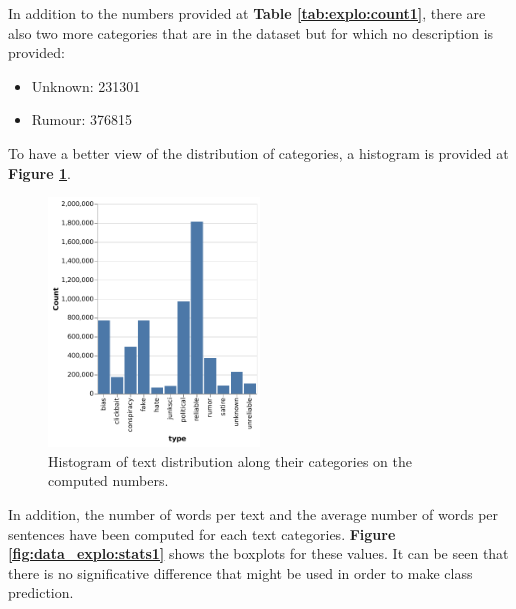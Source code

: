 In addition to the numbers provided at \textbf{Table \ref{tab:explo:count1}}, there are also two more categories that are in the dataset but for which no description is provided: 
\begin{itemize}
  \item Unknown: 231301
  \item Rumour: 376815
\end{itemize}
 To have a better view of the distribution of categories, a histogram is provided at \textbf{Figure \ref{fig:chap1:hist1}}.\\
\begin{figure}[!ht]
 \centering
 \includegraphics[width=0.5\textwidth]{images/data_exploration/plot1}
 \caption{Histogram of text distribution along their categories on the computed numbers. }
 \label{fig:chap1:hist1}
\end{figure}
In addition, the number of words per text and the average number of words per sentences have been computed for each text categories. \textbf{Figure \ref{fig:data_explo:stats1}} shows the boxplots for these values. It can be seen that there is no significative difference that might be used in order to make class prediction.\\ 
